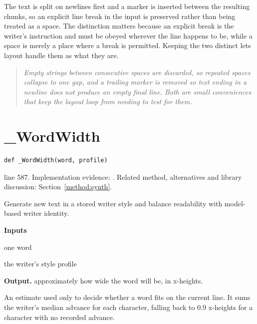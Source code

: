 The text is split on newlines first and a marker is inserted between the resulting chunks, so an explicit line break in the input is preserved rather than being treated as a space. The distinction matters because an explicit break is the writer's instruction and must be obeyed wherever the line happens to be, while a space is merely a place where a break is permitted. Keeping the two distinct lets layout handle them as what they are.


\begin{quote}\small\itshape Empty strings between consecutive spaces are discarded, so repeated spaces collapse to one gap, and a trailing marker is removed so text ending in a newline does not produce an empty final line. Both are small conveniences that keep the layout loop from needing to test for them.\end{quote}


\section{\_WordWidth}\label{fn:synthesise:-WordWidth}
\begin{lstlisting}[style=sig]
def _WordWidth(word, profile)
\end{lstlisting}
 line 587. Implementation evidence: \cite{code2026}. Related method, alternatives and library discussion: Section~\ref{method:synth}.


Generate new text in a stored writer style and balance readability with model-based writer identity.




\noindent\textbf{Inputs}
\begin{description}[leftmargin=2.2em,style=nextline,font=\normalfont\ttfamily]\setlength\itemsep{1pt}
  \item[{word}] \normalfont one word
  \item[{profile}] \normalfont the writer's style profile
\end{description}

\noindent\textbf{Output.} approximately how wide the word will be, in x-heights.


An estimate used only to decide whether a word fits on the current line. It sums the writer's median advance for each character, falling back to 0.9 x-heights for a character with no recorded advance.


